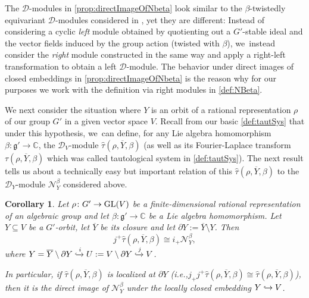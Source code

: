 \documentclass[11pt]{article}
\newcommand{\ie}{i.e.,\xspace}
\let\mathds\mathbb
\newcommand\hto{\mathrel{\lhook\joinrel\to}}
\newtheorem{cor}[thm]{Corollary}
\newcommand{\dC}{{\mathds C}}\let\C\dC
\newcommand{\frg}{\mathfrak{g}}
\DeclareMathOperator{\GL}{\textup{GL}}
\begin{document}
The $\mathscr{D}$\nobreakdash-mod\-ules in \cref{prop:directImageOfNbeta} look similar to the $\beta$-twistedly equivariant $\mathscr{D}$\nobreakdash-mod\-ules considered in \cite[II.2]{Hot98}, yet they are different: Instead of considering a cyclic \emph{left} module obtained by quotienting out a $G'$-stable ideal and the vector fields induced by the group action (twisted with $\beta$), we~instead consider the \emph{right} module constructed in the same way and apply a right-left transformation to obtain a left $\mathscr{D}$\nobreakdash-mod\-ule. The behavior under direct images of closed embeddings in \cref{prop:directImageOfNbeta} is the reason why for our purposes we work with the definition via right modules in \cref{def:NBeta}.

We next consider the situation where $Y$ is an orbit
of a rational representation $\rho$ of our group $G'$ in a given vector space $V$. Recall from our basic \cref{def:tautSys} that under this hypothesis, we~can define, for any Lie algebra homomorphism $\beta\colon \frg'\to \dC$, the $\mathscr{D}_V$\nobreakdash-mod\-ule $\hat{\tau}(\rho, \overline{Y},\beta)$ (as well as its Fourier-Laplace transform $\tau(\rho, \overline{Y},\beta)$ which was called tautological system in \cref{def:tautSys}). The next result tells us about a technically easy but important relation of this $\hat{\tau}(\rho, \overline{Y},\beta)$ to the $\mathscr{D}_Y$\nobreakdash-mod\-ule $\mathscr{N}_Y^\beta$ considered above.

\begin{cor} \label{cor:FLTautSysAsDirectImage}
Let $\rho \colon G' \to \GL(V)$ be a finite-dimensional rational representation of an algebraic group and let $\beta \colon \frg' \to \C$ be a Lie algebra homomorphism. Let $Y \subseteq V$ be a $G'$-orbit, let $\overline{Y}$ be its closure and let $\partial Y := \overline Y \setminus Y$.
Then
\[
j^+ \hat{\tau}(\rho, \overline{Y}, \beta) \cong i_+ \mathscr{N}_{Y}^{\beta},
\]
where $Y = \overline Y \setminus \partial Y \xhookrightarrow{i} U:=V \setminus \partial Y \xhookrightarrow{j} V$.

In particular, if $\hat{\tau}(\rho, \overline{Y}, \beta)$ is localized at $\partial Y$ (\ie $j_+ j^+ \hat{\tau}(\rho,\overline{Y},\beta) \cong \hat{\tau}(\rho,\overline{Y},\beta)$), then it is the direct image of $\mathscr{N}_{Y}^{\beta}$ under the locally closed embedding $Y \hto V$.
\end{cor}
\end{document}
